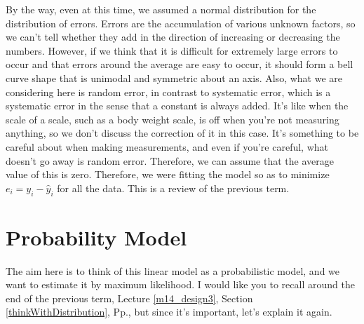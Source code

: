 \documentclass{ltjbook}
\begin{document}
By the way, even at this time, we assumed a normal distribution for the distribution of errors. Errors are the accumulation of various unknown factors, so we can't tell whether they add in the direction of increasing or decreasing the numbers. However, if we think that it is difficult for extremely large errors to occur and that errors around the average are easy to occur, it should form a bell curve shape that is unimodal and symmetric about an axis. Also, what we are considering here is random error, in contrast to systematic error, which is a systematic error in the sense that a constant is always added. It's like when the scale of a scale, such as a body weight scale, is off when you're not measuring anything, so we don't discuss the correction of it in this case. It's something to be careful about when making measurements, and even if you're careful, what doesn't go away is random error. Therefore, we can assume that the average value of this is zero. Therefore, we were fitting the model so as to minimize $e_i = y_i - \hat{y}_i$ for all the data. This is a review of the previous term.

\section{Probability Model}
The aim here is to think of this linear model as a probabilistic model, and we want to estimate it by maximum likelihood. I would like you to recall around the end of the previous term, Lecture \ref{m14_design3}, Section \ref{thinkWithDistribution}, Pp.\pageref{thinkWithDistribution}, but since it's important, let's explain it again.
\end{document}
